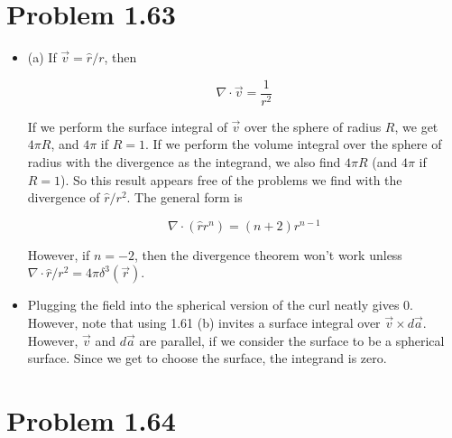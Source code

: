 \documentclass[10pt]{article}
\begin{document}
\section{Problem 1.63}

\begin{itemize}
\item (a) If $\vec{v} = \hat{r}/r$, then

\begin{equation}
\nabla \cdot \vec{v} = \frac{1}{r^2}
\end{equation}

If we perform the surface integral of $\vec{v}$ over the sphere of radius $R$, we get $4\pi R$, and $4\pi$ if $R = 1$.  If we perform the volume integral over the sphere of radius with the divergence as the integrand, we also find $4\pi R$ (and $4\pi$ if $R = 1$).  So this result appears free of the problems we find with the divergence of $\hat{r}/r^2$.  The general form is

\begin{equation}
\nabla \cdot (\hat{r} r^n) = (n+2) r^{n-1}
\end{equation}

However, if $n = -2$, then the divergence theorem won't work unless $\nabla \cdot \hat{r}/r^2 = 4\pi \delta^3(\vec{r})$.

\item Plugging the field into the spherical version of the curl neatly gives 0.  However, note that using 1.61 (b) invites a surface integral over $\vec{v} \times d\vec{a}$.  However, $\vec{v}$ and $d\vec{a}$ are parallel, if we consider the surface to be a spherical surface.  Since we get to choose the surface, the integrand is zero.

\end{itemize}

\section{Problem 1.64}
\end{document}
